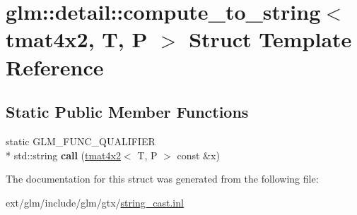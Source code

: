 \hypertarget{structglm_1_1detail_1_1compute__to__string_3_01tmat4x2_00_01_t_00_01_p_01_4}{\section{glm\-:\-:detail\-:\-:compute\-\_\-to\-\_\-string$<$ tmat4x2, T, P $>$ Struct Template Reference}
\label{structglm_1_1detail_1_1compute__to__string_3_01tmat4x2_00_01_t_00_01_p_01_4}
}
\subsection*{Static Public Member Functions}
\begin{DoxyCompactItemize}
\item 
\hypertarget{structglm_1_1detail_1_1compute__to__string_3_01tmat4x2_00_01_t_00_01_p_01_4_a1371cdf230f35b3c1fbd8cfad23bd364}{static G\-L\-M\-\_\-\-F\-U\-N\-C\-\_\-\-Q\-U\-A\-L\-I\-F\-I\-E\-R \\*
std\-::string {\bfseries call} (\hyperlink{structglm_1_1tmat4x2}{tmat4x2}$<$ T, P $>$ const \&x)}\label{structglm_1_1detail_1_1compute__to__string_3_01tmat4x2_00_01_t_00_01_p_01_4_a1371cdf230f35b3c1fbd8cfad23bd364}

\end{DoxyCompactItemize}


The documentation for this struct was generated from the following file\-:\begin{DoxyCompactItemize}
\item 
ext/glm/include/glm/gtx/\hyperlink{string__cast_8inl}{string\-\_\-cast.\-inl}\end{DoxyCompactItemize}
